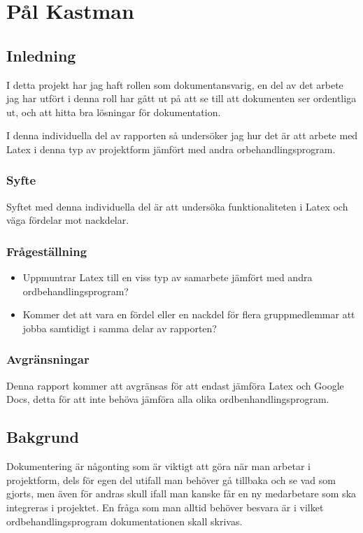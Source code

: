 \section{Pål Kastman}
\subsection{Inledning}
I detta projekt har jag haft rollen som dokumentansvarig, en del av det arbete jag har utfört i denna roll har gått ut på att se till att dokumenten ser ordentliga ut, och att hitta bra lösningar för dokumentation.

I denna individuella del av rapporten så undersöker jag hur det är att arbete med Latex i denna typ av projektform jämfört med andra orbehandlingsprogram.

\subsubsection{Syfte}
Syftet med denna individuella del är att undersöka funktionaliteten i Latex och väga fördelar mot nackdelar.

\subsubsection{Frågeställning}
\begin{itemize}
\item Uppmuntrar Latex till en viss typ av samarbete jämfört med andra ordbehandlingsprogram?
\item Kommer det att vara en fördel eller en nackdel för flera gruppmedlemmar att jobba samtidigt i samma delar av rapporten?
\end{itemize}

\subsubsection{Avgränsningar}
Denna rapport kommer att avgränsas för att endast jämföra Latex och Google Docs, detta för att inte behöva jämföra alla olika ordbenhandlingsprogram.

\subsection{Bakgrund}
Dokumentering är någonting som är viktigt att göra när man arbetar i projektform, dels för egen del utifall man behöver gå tillbaka och se vad som gjorts, men även för andras skull ifall man kanske får en ny medarbetare som ska integreras i 
projektet. En fråga som man alltid behöver besvara är i vilket ordbehandlingsprogram dokumentationen skall skrivas. 

